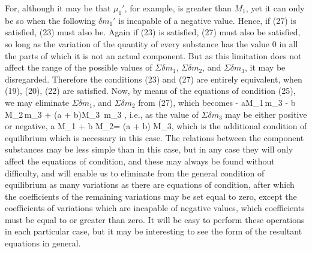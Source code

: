 \documentclass[12pt]{memoir}
\begin{document}
For, although it may be that $\mu_1'$, for example, is greater than $M_1$, yet it can only be so when the following $\delta m_1'$ is incapable of a negative value. Hence, if (27) is satisfied, (23) must also be. Again if (23) is satisfied, (27) must also be satisfied, so long as the variation of the quantity of every substance has the value 0 in all the parts of which it is not an actual component. But as this limitation does not affect the range of the possible values of  $\Sigma \delta m_1$, $\Sigma \delta m_2$, and $\Sigma \delta m_3$, it may be disregarded. Therefore the conditions (23) and (27) are entirely equivalent, when (19), (20), (22) are satisfied. Now, by means of the equations of condition (25), we may eliminate $\Sigma \delta m_1$, and $\Sigma \delta m_2$ from (27), which becomes
\eqs - aM_1\,\Sigma \delta m_3 - b M_2\,\Sigma \delta m_3 + (a + b)M_3 \,\Sigma \delta m_3 ,        \label{28}\eqe
i.e., as the value of $\Sigma \delta m_3$ may be either positive or negative,
\eqs a M_1 + b M_2= (a + b) M_3,     \label{29}\eqe
which is the additional condition of equilibrium which is necessary in this case.
The relations between the component substances may be less simple than in this case, but in any case they will only affect the equations of condition, and these may always be found without difficulty, and will enable us to eliminate from the general condition of equilibrium as many variations as there are equations of condition, after which the coefficients of the remaining variations may be set equal to zero, except the coefficients of variations which are incapable of negative values, which coefficients must be equal to or greater than zero. It will be easy to perform these operations in each particular case, but it may be interesting to see the form of the resultant equations in general.
\end{document}
